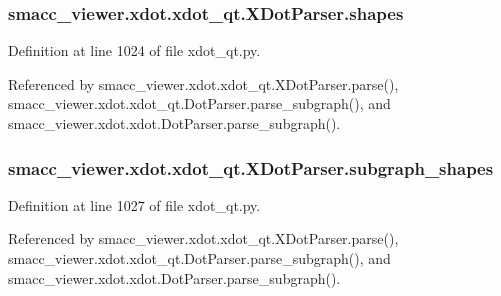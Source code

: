 \subsubsection[{\texorpdfstring{shapes}{shapes}}]{\setlength{\rightskip}{0pt plus 5cm}smacc\+\_\+viewer.\+xdot.\+xdot\+\_\+qt.\+X\+Dot\+Parser.\+shapes}\hypertarget{classsmacc__viewer_1_1xdot_1_1xdot__qt_1_1XDotParser_a7476ac352d9ef784270c6e58ec798e27}{}\label{classsmacc__viewer_1_1xdot_1_1xdot__qt_1_1XDotParser_a7476ac352d9ef784270c6e58ec798e27}


Definition at line 1024 of file xdot\+\_\+qt.\+py.



Referenced by smacc\+\_\+viewer.\+xdot.\+xdot\+\_\+qt.\+X\+Dot\+Parser.\+parse(), smacc\+\_\+viewer.\+xdot.\+xdot\+\_\+qt.\+Dot\+Parser.\+parse\+\_\+subgraph(), and smacc\+\_\+viewer.\+xdot.\+xdot.\+Dot\+Parser.\+parse\+\_\+subgraph().

\subsubsection[{\texorpdfstring{subgraph\+\_\+shapes}{subgraph_shapes}}]{\setlength{\rightskip}{0pt plus 5cm}smacc\+\_\+viewer.\+xdot.\+xdot\+\_\+qt.\+X\+Dot\+Parser.\+subgraph\+\_\+shapes}\hypertarget{classsmacc__viewer_1_1xdot_1_1xdot__qt_1_1XDotParser_a3e206c4dae94296f11b63fd730aa485b}{}\label{classsmacc__viewer_1_1xdot_1_1xdot__qt_1_1XDotParser_a3e206c4dae94296f11b63fd730aa485b}


Definition at line 1027 of file xdot\+\_\+qt.\+py.



Referenced by smacc\+\_\+viewer.\+xdot.\+xdot\+\_\+qt.\+X\+Dot\+Parser.\+parse(), smacc\+\_\+viewer.\+xdot.\+xdot\+\_\+qt.\+Dot\+Parser.\+parse\+\_\+subgraph(), and smacc\+\_\+viewer.\+xdot.\+xdot.\+Dot\+Parser.\+parse\+\_\+subgraph().


